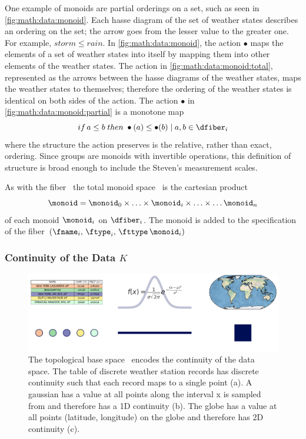 \documentclass[../main.tex]{subfiles}
\begin{document}
One example of monoids are partial orderings on a set, such as seen in \autoref{fig:math:data:monoid}. Each hasse diagram of the set of weather states describes an ordering on the set; the arrow goes from the lesser value to the greater one. For example, $storm \leq rain$. In \autoref{fig:math:data:monoid}, the action $\bullet$ maps the elements of a set of weather states into itself by mapping them into other elements of the weather states. The action in  \autoref{fig:math:data:monoid:total}, represented as the arrows between the hasse diagrams of the weather states, maps the weather states to themselves; therefore the ordering of the weather states is identical on both sides of the action. The action $\bullet$ in \autoref{fig:math:data:monoid:partial} is a monotone map\cite{fongInvitationAppliedCategory2019}
\begin{equation*}
    if\, a \leq b \; then \; \bullet(a) \leq \bullet(b) \mid a,b \in \dfiber_{i}
\end{equation*}
where the structure the action preserves is the relative, rather than exact, ordering. Since groups are monoids with invertible operations, this definition of structure is broad enough to include the Steven's measurement scales\cite{stevensTheoryScalesMeasurement1946,leaFormalizationMeasurementScale}.

As with the fiber \dfiber\, the total monoid space \monoid\ is the cartesian product
\begin{equation}
    \label{eq:math:data:monoid:decompose}
\monoid= \monoid_{0} \times \ldots \times \monoid_{i}\times \ldots \times\ldots \monoid_{n}
\end{equation}
of each monoid $\monoid_{i}$ on $\dfiber_{i}$.  The monoid is added to the specification of the fiber $(\fname_i,\, \ftype_i,\, \fttype\, \monoid_i)$

\subsubsection{Continuity of the Data $K$} 
\label{sec:math:data:base}
\begin{figure}[H]
    \includegraphics[width=1\textwidth]{figures/math/k_different_types.png}
    \caption{The topological base space \dbase\ encodes the continuity of the data space. The table of discrete weather station records has discrete continuity such that each record maps to a single point (a). A gaussian has a value at all points along the interval x is sampled from and therefore has a 1D continuity (b). The globe has a value at all points (latitude, longitude) on the globe and therefore has 2D continuity (c). }
    \label{fig:math:data:base:types}
\end{figure}
\end{document}
